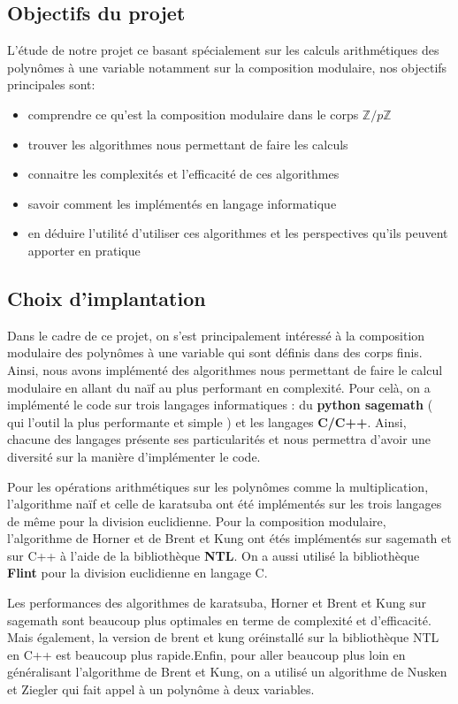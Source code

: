 \documentclass[a4paper]{article}
\begin{document}
\subsection{Objectifs du projet}

L'étude de notre projet ce basant spécialement sur les calculs arithmétiques des polynômes à une variable notamment sur la composition modulaire, nos objectifs principales sont:
\begin{itemize}
	\item comprendre ce qu'est la composition modulaire dans le corps ${\mathbb{Z}/p \mathbb{Z}}$
	\item trouver les algorithmes nous permettant de faire les calculs 
	\item connaitre les complexités et l'efficacité de ces algorithmes
	\item savoir comment les implémentés en langage informatique 
	\item en déduire l'utilité d'utiliser ces algorithmes et les perspectives qu'ils peuvent apporter en pratique

\end{itemize}

\subsection{Choix d'implantation}

Dans le cadre de ce projet, on s'est principalement intéressé à la composition modulaire des polynômes à une variable qui sont définis dans des corps finis. Ainsi, nous avons implémenté des algorithmes nous permettant de faire le calcul modulaire en allant du naïf au plus performant en complexité. Pour celà, on a implémenté le code sur trois langages informatiques : du \textbf{python sagemath} ( qui l'outil la plus performante et simple ) et les langages \textbf{C/C++}. Ainsi, chacune des langages présente ses particularités et nous permettra d'avoir une diversité sur la manière d'implémenter le code.

Pour les opérations arithmétiques sur les polynômes comme la multiplication, l'algorithme naïf et celle de karatsuba ont été implémentés sur les trois langages de même pour la division euclidienne. Pour la composition modulaire, l'algorithme de Horner et de Brent et Kung ont étés implémentés sur sagemath et sur C++ à l'aide de la bibliothèque \textbf{NTL}. On a aussi utilisé la bibliothèque \textbf{Flint} pour la division euclidienne en langage C.

Les performances des algorithmes de karatsuba, Horner et Brent et Kung sur sagemath sont beaucoup plus optimales en terme de complexité et d'efficacité. Mais également, la version de brent et kung oréinstallé sur la bibliothèque NTL en C++ est beaucoup plus rapide.Enfin, pour aller beaucoup plus loin en généralisant l'algorithme de Brent et Kung, on a utilisé un algorithme de Nusken et Ziegler qui fait appel à un polynôme à deux variables.  
\end{document}
